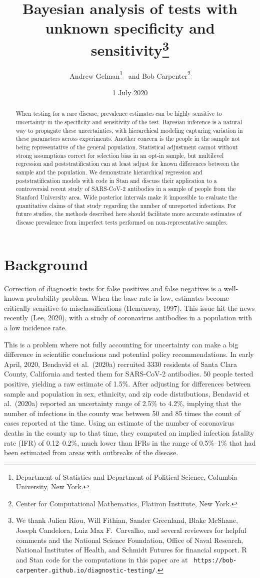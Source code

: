 \documentclass[11pt]{article}
\title{\bf Bayesian analysis of tests with unknown specificity and
  sensitivity\footnote{We thank Julien Riou, Will Fithian, Sander
    Greenland, Blake McShane, Joseph Candelora, Luiz Max F.~Carvalho,
    and several reviewers for helpful comments and the National
    Science Foundation, Office of Naval Research, National Institutes
    of Health, and Schmidt Futures for financial support.  R and Stan
    code for the computations in this paper are at {\tt
      https://bob-carpenter.github.io/diagnostic-testing/}.}\vspace{.1in}}
\author{Andrew Gelman\footnote{Department of Statistics and Department
    of Political Science, Columbia University, New York.}  \ and Bob
  Carpenter\footnote{Center for Computational Mathematics, Flatiron
    Institute, New York.}  \vspace{.1in}}
\date{1 July 2020}
\begin{document}
\sloppy
\maketitle

\begin{abstract}
\noindent
When testing for a rare disease, prevalence estimates can be highly
sensitive to uncertainty in the specificity and sensitivity of the
test.  Bayesian inference is a natural way to propagate these
uncertainties, with hierarchical modeling capturing variation in these
parameters across experiments.  Another concern is the people in the
sample not being representative of the general population.
Statistical adjustment cannot without strong assumptions correct for
selection bias in an opt-in sample, but multilevel regression and
poststratification can at least adjust for known differences between
the sample and the population.  We demonstrate hierarchical regression
and poststratification models with code in Stan and discuss their
application to a controversial recent study of SARS-CoV-2 antibodies in
a sample of people from the Stanford University area.  Wide posterior
intervals make it impossible to evaluate the quantitative claims of
that study regarding the number of unreported infections.  For future
studies, the methods described here should facilitate more accurate
estimates of disease prevalence from imperfect tests performed on
non-representative samples.
\end{abstract}

\section{Background}

Correction of diagnostic tests for false positives and false negatives
is a well-known probability problem.  When the base rate is low,
estimates become critically sensitive to misclassifications (Hemenway,
1997).  This issue hit the news recently (Lee, 2020), with a
study of coronavirus antibodies in a population with a low incidence
rate.

This is a problem where not fully accounting for uncertainty can make
a big difference in scientific conclusions and potential policy
recommendations.  In early April, 2020, Bendavid et al.\ (2020a)
recruited 3330 residents of Santa Clara County, California and tested
them for SARS-CoV-2 antibodies.  50 people tested positive, yielding a
raw estimate of 1.5\%.  After adjusting for differences between sample
and population in sex, ethnicity, and zip code distributions, Bendavid
et al.\ (2020a) reported an uncertainty range of 2.5\% to 4.2\%,
implying that the number of infections in the county was between 50
and 85 times the count of cases reported at the time.  Using an
estimate of the number of coronavirus deaths in the county up to that
time, they computed an implied infection fatality rate (IFR) of
0.12--0.2\%, much lower than IFRs in the range of 0.5\%--1\% that had
been estimated from areas with outbreaks of the disease.
\end{document}
